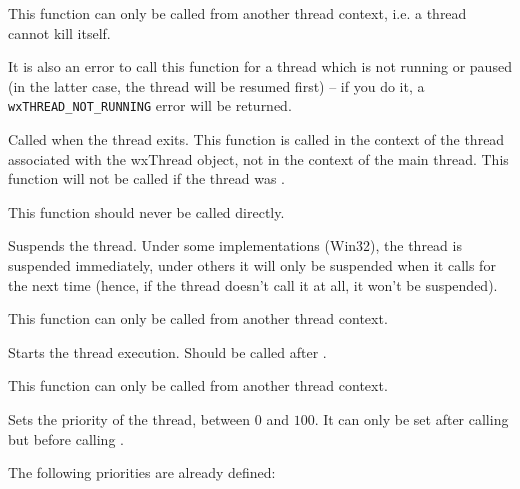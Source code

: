 This function can only be called from another thread context, i.e. a thread
cannot kill itself.

It is also an error to call this function for a thread which is not running or
paused (in the latter case, the thread will be resumed first) -- if you do it,
a {\tt wxTHREAD\_NOT\_RUNNING} error will be returned.


\label{wxthreadonexit}


Called when the thread exits. This function is called in the context of the
thread associated with the wxThread object, not in the context of the main
thread. This function will not be called if the thread was
.

This function should never be called directly.


\label{wxthreadpause}


Suspends the thread. Under some implementations (Win32), the thread is
suspended immediately, under others it will only be suspended when it calls
 for the next time (hence, if the
thread doesn't call it at all, it won't be suspended).

This function can only be called from another thread context.


\label{wxthreadrun}


Starts the thread execution. Should be called after
.

This function can only be called from another thread context.


\label{wxthreadsetpriority}


Sets the priority of the thread, between $0$ and $100$. It can only be set
after calling  but before calling
.

The following priorities are already defined:

\twocolwidtha{7cm}
\begin{twocollist}\itemsep=0pt
\end{twocollist}



